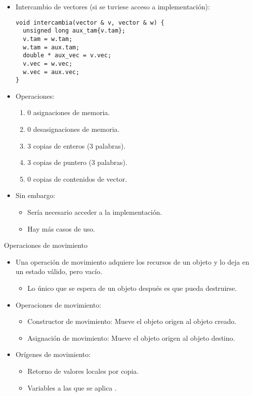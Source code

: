 \begin{frame}[fragile]
\begin{itemize}
  \item Intercambio de vectores (si se tuviese acceso a implementación):
\begin{lstlisting}
void intercambia(vector & v, vector & w) {
  unsigned long aux_tam{v.tam};
  v.tam = w.tam;
  w.tam = aux.tam;
  double * aux_vec = v.vec;
  v.vec = w.vec;
  w.vec = aux.vec;
}
\end{lstlisting}
  \item Operaciones:
    \begin{enumerate}
      \item 0 asignaciones de memoria.
      \item 0 desasignaciones de memoria.
      \item 3 copias de enteros (3 palabras).
      \item 3 copias de puntero (3 palabras).
      \item 0 copias de contenidos de vector.
    \end{enumerate}
  \item Sin embargo:
    \begin{itemize}
      \item Sería necesario acceder a la implementación.
      \item Hay más casos de uso.
    \end{itemize}
\end{itemize}
\end{frame}

\begin{frame}[fragile]{Operaciones de movimiento}
\begin{itemize}
  \item Una operación de movimiento adquiere los recursos de un objeto y lo deja en un estado válido, pero vacío.
    \begin{itemize}
      \item Lo único que se espera de un objeto después es que pueda destruirse.
    \end{itemize}
  \item Operaciones de movimiento:
    \begin{itemize}
      \item Constructor de movimiento: Mueve el objeto origen al objeto creado.
      \item Asignación de movimiento: Mueve el objeto origen al objeto destino.
    \end{itemize}
  \item Orígenes de movimiento:
    \begin{itemize}
      \item Retorno de valores locales por copia.
      \item Variables a las que se aplica .
    \end{itemize}
\end{itemize}
\end{frame}

